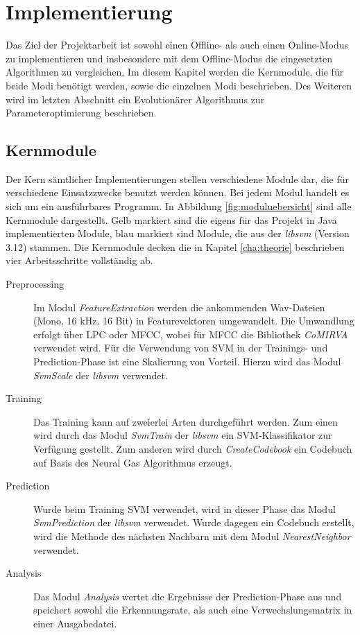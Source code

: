 \chapter{Implementierung}
\label{cha:implementierung}
Das Ziel der Projektarbeit ist sowohl einen Offline- als auch einen Online-Modus zu implementieren und insbesondere mit dem Offline-Modus die eingesetzten Algorithmen zu vergleichen. Im diesem Kapitel werden die Kernmodule, die für beide Modi benötigt werden, sowie die einzelnen Modi beschrieben. Des Weiteren wird im letzten Abschnitt ein Evolutionärer Algorithmus zur Parameteroptimierung beschrieben.

\section{Kernmodule}
Der Kern sämtlicher Implementierungen stellen verschiedene Module dar, die für verschiedene Einsatzzwecke benutzt werden können. Bei jedem Modul handelt es sich um ein ausführbares Programm. In Abbildung \ref{fig:moduluebersicht} sind alle Kernmodule dargestellt. Gelb markiert sind die eigens für das Projekt in Java implementierten Module, blau markiert sind Module, die aus der \emph{libsvm} (Version 3.12) stammen. Die Kernmodule decken die in Kapitel \ref{cha:theorie} beschrieben vier Arbeitsschritte vollständig ab. 

\begin{description}
	\item[Preprocessing] Im Modul \emph{FeatureExtraction} werden die ankommenden Wav-Dateien (Mono, 16 kHz, 16 Bit) in Featurevektoren umgewandelt. Die Umwandlung erfolgt über LPC oder MFCC, wobei für MFCC die Bibliothek \emph{CoMIRVA} verwendet wird. \cite{bib:comirva} Für die Verwendung von SVM in der Trainings- und Prediction-Phase ist eine Skalierung von Vorteil. Hierzu wird das Modul \emph{SvmScale} der \emph{libsvm} verwendet.
	\item[Training] Das Training kann auf zweierlei Arten durchgeführt werden. Zum einen wird durch das Modul \emph{SvmTrain} der \emph{libsvm} ein SVM-Klassifikator zur Verfügung gestellt. Zum anderen wird durch \emph{CreateCodebook} ein Codebuch auf Basis des Neural Gas Algorithmus erzeugt.
	\item[Prediction] Wurde beim Training SVM verwendet, wird in dieser Phase das Modul \emph{SvmPrediction} der \emph{libsvm} verwendet. Wurde dagegen ein Codebuch erstellt, wird die Methode des nächsten Nachbarn mit dem Modul \emph{NearestNeighbor} verwendet.
	\item[Analysis] Das Modul \emph{Analysis} wertet die Ergebnisse der Prediction-Phase aus und speichert sowohl die Erkennungsrate, als auch eine Verwechslungsmatrix in einer Ausgabedatei.
\end{description}

